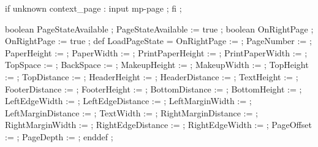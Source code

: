 


\unprotect 

\appendtoks 
  if unknown context_page : input mp-page ; fi ; 
\to \MPinitializations 


  boolean PageStateAvailable ; PageStateAvailable := true ; 
  boolean OnRightPage        ; OnRightPage        := true ;  
  def LoadPageState = 
    OnRightPage         :=     \MPonrightpage ; 
    PageNumber          :=     \realfolio ; 
    PaperHeight         := \the\papierhoogte ;
    PaperWidth          := \the\papierbreedte ;
    PrintPaperHeight    := \the\printpapierhoogte ;
    PrintPaperWidth     := \the\printpapierbreedte ;
    TopSpace            := \the\kopwit ;
    BackSpace           := \the\rugwit ;
    MakeupHeight        := \the\zethoogte ;
    MakeupWidth         := \the\zetbreedte ;
    TopHeight           := \the\bovenhoogte ;
    TopDistance         :=     \bovenafstand ;
    HeaderHeight        := \the\hoofdhoogte ;
    HeaderDistance      :=     \hoofdafstand ;
    TextHeight          := \the\teksthoogte ;
    FooterDistance      :=     \voetafstand ;
    FooterHeight        := \the\voethoogte ;
    BottomDistance      :=     \onderafstand ;
    BottomHeight        := \the\onderhoogte ;
    LeftEdgeWidth       := \the\linkerrandbreedte ;
    LeftEdgeDistance    :=     \linkerrandafstand ;
    LeftMarginWidth     := \the\linkermargebreedte ;
    LeftMarginDistance  :=     \linkermargeafstand ;
    TextWidth           := \the\tekstbreedte ;
    RightMarginDistance :=     \rechtermargeafstand ;
    RightMarginWidth    := \the\rechtermargebreedte ;
    RightEdgeDistance   :=     \rechterrandafstand ;
    RightEdgeWidth      := \the\rechterrandbreedte ;
    PageOffset          :=     \MPpageoffset ;
    PageDepth           :=     \MPpagedepth ;
  enddef ; 
\stopuseMPgraphic
              
